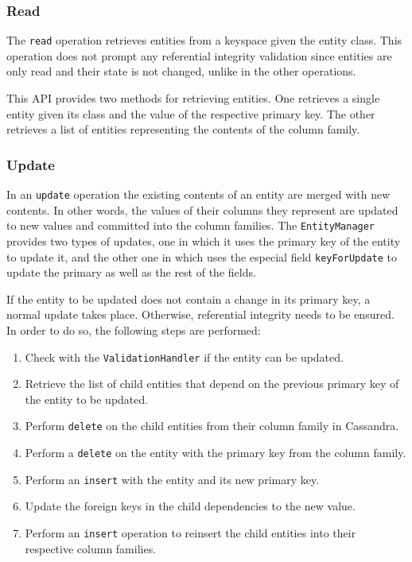 		\subsubsection{Read}
		The  \texttt{read} operation retrieves  entities from a keyspace given the
		entity class. This operation does not prompt any referential integrity validation since
 		entities are only read and their state is not changed, unlike in the other
		operations.
		
		
		This \ac{API} provides two methods for retrieving entities. One retrieves a
		single entity given its class and the value of the respective primary key. The
		other retrieves a list of entities representing the contents of
		the column family.

		
		
		\subsubsection{Update}\label{ss:update}
		In an \texttt{update} operation the existing contents of an entity are merged
		with new contents.  In other words, the  values of their columns they
		represent are updated to new values and committed into the column families.  
		 The \texttt{EntityManager} provides two types of updates, one in which it
		 uses the primary key of the entity to update it, and the other one in
		 which uses the especial field \texttt{keyForUpdate} to update the primary as
		 well as the rest of the fields. 
		 
		 If the entity to be updated does not contain a change in its primary key, a
		 normal update takes place. Otherwise, referential integrity needs to be
		 ensured. In order to do so, the following steps are performed:
		\begin{enumerate}
		  \item Check with the \texttt{ValidationHandler} if the entity can be
		  updated.
		  \item Retrieve the list of child entities that depend on the previous
		  primary key of the entity to be updated.
		  \item Perform \texttt{delete} on the child entities from their column family
		  in Cassandra.
		  \item Perform a \texttt{delete} on the entity with the primary key from the
		  column family.
		  \item Perform an \texttt{insert} with the entity and its new primary key.
		  \item Update the foreign keys in the child dependencies to
		  the new value.
		  \item Perform an \texttt{insert} operation to reinsert the child entities
		  into their respective column families.
		\end{enumerate}
		
